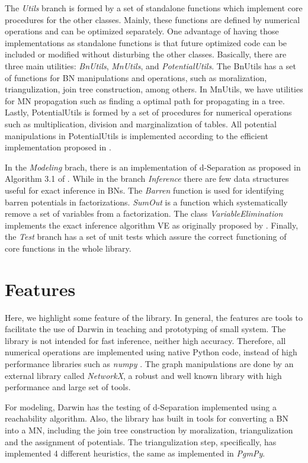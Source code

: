 The \emph{Utils} branch is formed by a set of standalone functions which implement core procedures for the other classes.
Mainly, these functions are defined by numerical operations and can be optimized separately.
One advantage of having those implementations as standalone functions is that future optimized code can be included or modified without disturbing the other classes.
Basically, there are three main utilities: \emph{BnUtils}, \emph{MnUtils}, and \emph{PotentialUtils}.
The BnUtils has a set of functions for BN manipulations and operations, such as moralization, triangulization, join tree construction, among others.
In MnUtils, we have utilities for MN propagation such as finding a optimal path for propagating in a tree.
Lastly, PotentialUtils is formed by a set of procedures for numerical operations such as multiplication, division and marginalization of tables.
All potential manipulations in PotentialUtils is implemented according to the efficient implementation proposed in \cite{koll09}.

In the \emph{Modeling} brach, there is an implementation of d-Separation as proposed in Algorithm 3.1 of \cite{koll09}.
While in the branch \emph{Inference} there are few data structures useful for exact inference in BNs.
The \emph{Barren} function is used for identifying barren potentials in factorizations.
\emph{SumOut} is a function which systematically remove a set of variables from a factorization.
The class \emph{VariableElimination} implements the exact inference algorithm VE as originally proposed by \cite{zhan94}.
Finally, the \emph{Test} branch has a set of unit tests which assure the correct functioning of core functions in the whole library.

\section{Features}
\label{sec:system:sec2}

Here, we highlight some feature of the library.
In general, the features are tools to facilitate the use of Darwin in teaching and prototyping of small system.
The library is not intended for fast inference, neither high accuracy.
Therefore, all numerical operations are implemented using native Python code, instead of high performance libraries such as \emph{numpy} \cite{van2011numpy}.
The graph manipulations are done by an external library called \emph{NetworkX}, a robust and well known library with high performance and large set of tools.

For modeling, Darwin has the testing of d-Separation implemented using a reachability algorithm.
Also, the library has built in tools for converting a BN into a MN, including the join tree construction by moralization, triangulization and the assignment of potentials.
The triangulization step, specifically, has implemented 4 different heuristics, the same as implemented in \emph{PgmPy}.

